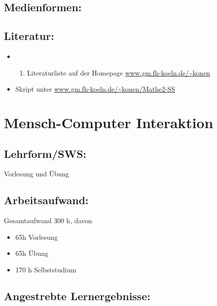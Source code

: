 \section{Medienformen:}\label{medienformen-14}

\section{Literatur:}\label{literatur-14}

\begin{itemize}
\item
  \begin{enumerate}
  \def\labelenumi{\alph{enumi}.}
  \setcounter{enumi}{18}
  \tightlist
  \item
    Literaturliste auf der Homepage \url{www.gm.fh-koeln.de/~konen}
  \end{enumerate}
\item
  Skript unter \url{www.gm.fh-koeln.de/~konen/Mathe2-SS}
\end{itemize}

\chapter{Mensch-Computer Interaktion}\label{mensch-computer-interaktion}

\section{Lehrform/SWS:}\label{lehrformsws-15}

Vorlesung und Übung

\section{Arbeitsaufwand:}\label{arbeitsaufwand-15}

Gesamtaufwand 300 h, davon

\begin{itemize}
\tightlist
\item
  65h Vorlesung
\item
  65h Übung
\item
  170 h Selbststudium
\end{itemize}

\section{Angestrebte
Lernergebnisse:}\label{angestrebte-lernergebnisse-15}

